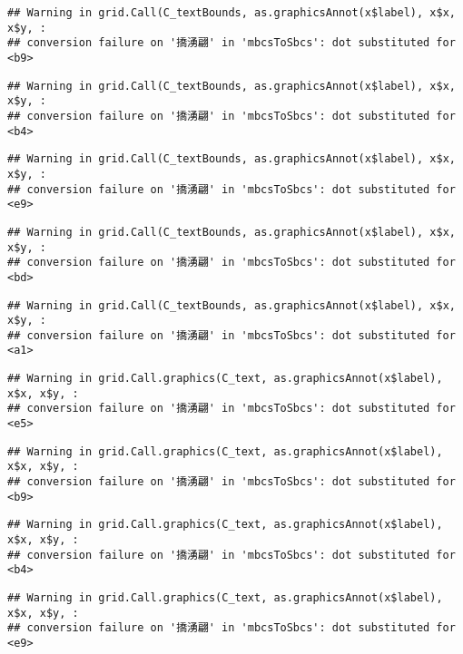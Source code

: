 \documentclass[
]{article}
\begin{document}
\begin{verbatim}
## Warning in grid.Call(C_textBounds, as.graphicsAnnot(x$label), x$x, x$y, :
## conversion failure on '撟湧翩' in 'mbcsToSbcs': dot substituted for <b9>
\end{verbatim}

\begin{verbatim}
## Warning in grid.Call(C_textBounds, as.graphicsAnnot(x$label), x$x, x$y, :
## conversion failure on '撟湧翩' in 'mbcsToSbcs': dot substituted for <b4>
\end{verbatim}

\begin{verbatim}
## Warning in grid.Call(C_textBounds, as.graphicsAnnot(x$label), x$x, x$y, :
## conversion failure on '撟湧翩' in 'mbcsToSbcs': dot substituted for <e9>
\end{verbatim}

\begin{verbatim}
## Warning in grid.Call(C_textBounds, as.graphicsAnnot(x$label), x$x, x$y, :
## conversion failure on '撟湧翩' in 'mbcsToSbcs': dot substituted for <bd>
\end{verbatim}

\begin{verbatim}
## Warning in grid.Call(C_textBounds, as.graphicsAnnot(x$label), x$x, x$y, :
## conversion failure on '撟湧翩' in 'mbcsToSbcs': dot substituted for <a1>
\end{verbatim}

\begin{verbatim}
## Warning in grid.Call.graphics(C_text, as.graphicsAnnot(x$label), x$x, x$y, :
## conversion failure on '撟湧翩' in 'mbcsToSbcs': dot substituted for <e5>
\end{verbatim}

\begin{verbatim}
## Warning in grid.Call.graphics(C_text, as.graphicsAnnot(x$label), x$x, x$y, :
## conversion failure on '撟湧翩' in 'mbcsToSbcs': dot substituted for <b9>
\end{verbatim}

\begin{verbatim}
## Warning in grid.Call.graphics(C_text, as.graphicsAnnot(x$label), x$x, x$y, :
## conversion failure on '撟湧翩' in 'mbcsToSbcs': dot substituted for <b4>
\end{verbatim}

\begin{verbatim}
## Warning in grid.Call.graphics(C_text, as.graphicsAnnot(x$label), x$x, x$y, :
## conversion failure on '撟湧翩' in 'mbcsToSbcs': dot substituted for <e9>
\end{verbatim}
\end{document}

